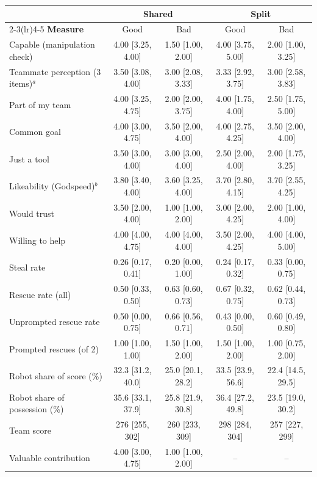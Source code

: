 \begin{table}[H]
\centering
\footnotesize
\begin{tabular}{lcccc}
\toprule
 & \multicolumn{2}{c}{\textbf{Shared}} & \multicolumn{2}{c}{\textbf{Split}} \\
\cmidrule(lr){2-3}\cmidrule(lr){4-5}
\textbf{Measure} & Good & Bad & Good & Bad \\
\midrule
Capable (manipulation check) & 4.00 [3.25, 4.00] & 1.50 [1.00, 2.00] & 4.00 [3.75, 5.00] & 2.00 [1.00, 3.25] \\
Teammate perception (3 items)$^{a}$ & 3.50 [3.08, 4.00] & 3.00 [2.08, 3.33] & 3.33 [2.92, 3.75] & 3.00 [2.58, 3.83] \\
\quad Part of my team & 4.00 [3.25, 4.75] & 2.00 [2.00, 3.75] & 4.00 [1.75, 4.00] & 2.50 [1.75, 5.00] \\
\quad Common goal & 4.00 [3.00, 4.75] & 3.50 [2.00, 4.00] & 4.00 [2.75, 4.25] & 3.50 [2.00, 4.00] \\
\quad Just a tool & 3.50 [3.00, 4.00] & 3.00 [3.00, 4.00] & 2.50 [2.00, 4.00] & 2.00 [1.75, 3.25] \\
Likeability (Godspeed)$^{b}$ & 3.80 [3.40, 4.00] & 3.60 [3.25, 4.00] & 3.70 [2.80, 4.15] & 3.70 [2.55, 4.25] \\
Would trust & 3.50 [2.00, 4.00] & 1.00 [1.00, 2.00] & 3.00 [2.00, 4.25] & 2.00 [1.00, 4.00] \\
Willing to help & 4.00 [4.00, 4.75] & 4.00 [4.00, 4.00] & 3.50 [2.00, 4.25] & 4.00 [4.00, 5.00] \\
Steal rate & 0.26 [0.17, 0.41] & 0.20 [0.00, 1.00] & 0.24 [0.17, 0.32] & 0.33 [0.00, 0.75] \\
Rescue rate (all) & 0.50 [0.33, 0.50] & 0.63 [0.60, 0.73] & 0.67 [0.32, 0.75] & 0.62 [0.44, 0.73] \\
Unprompted rescue rate & 0.50 [0.00, 0.75] & 0.66 [0.56, 0.71] & 0.43 [0.00, 0.50] & 0.60 [0.49, 0.80] \\
Prompted rescues (of 2) & 1.00 [1.00, 1.00] & 1.50 [1.00, 2.00] & 1.50 [1.00, 2.00] & 1.00 [0.75, 2.00] \\
Robot share of score (\%) & 32.3 [31.2, 40.0] & 25.0 [20.1, 28.2] & 33.5 [23.9, 56.6] & 22.4 [14.5, 29.5] \\
Robot share of possession (\%) & 35.6 [33.1, 37.9] & 25.8 [21.9, 30.8] & 36.4 [27.2, 49.8] & 23.5 [19.0, 30.2] \\
Team score & 276 [255, 302] & 260 [233, 309] & 298 [284, 304] & 257 [227, 299] \\
Valuable contribution & 4.00 [3.00, 4.75] & 1.00 [1.00, 2.00] & -- & -- \\

\end{tabular}
\end{table}
